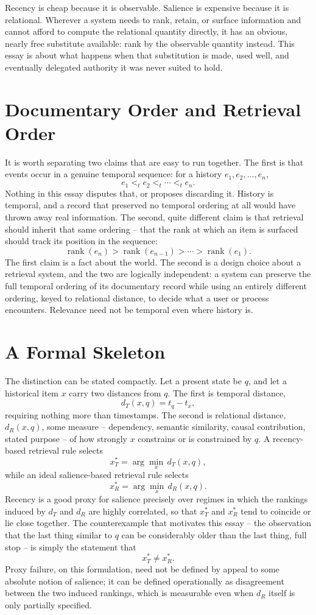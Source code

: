 \documentclass[11pt]{article}
\begin{document}
Recency is cheap because it is observable. Salience is expensive because it is relational. Wherever a system needs to rank, retain, or surface information and cannot afford to compute the relational quantity directly, it has an obvious, nearly free substitute available: rank by the observable quantity instead. This essay is about what happens when that substitution is made, used well, and eventually delegated authority it was never suited to hold.

\section{Documentary Order and Retrieval Order}

It is worth separating two claims that are easy to run together. The first is that events occur in a genuine temporal sequence: for a history $e_1, e_2, \ldots, e_n$,
\[
e_1 <_t e_2 <_t \cdots <_t e_n.
\]
Nothing in this essay disputes that, or proposes discarding it. History is temporal, and a record that preserved no temporal ordering at all would have thrown away real information. The second, quite different claim is that retrieval should inherit that same ordering -- that the rank at which an item is surfaced should track its position in the sequence:
\[
\operatorname{rank}(e_n) > \operatorname{rank}(e_{n-1}) > \cdots > \operatorname{rank}(e_1).
\]
The first claim is a fact about the world. The second is a design choice about a retrieval system, and the two are logically independent: a system can preserve the full temporal ordering of its documentary record while using an entirely different ordering, keyed to relational distance, to decide what a user or process encounters. Relevance need not be temporal even where history is.

\section{A Formal Skeleton}

The distinction can be stated compactly. Let a present state be $q$, and let a historical item $x$ carry two distances from $q$. The first is temporal distance,
\[
d_T(x,q) = t_q - t_x,
\]
requiring nothing more than timestamps. The second is relational distance, $d_R(x,q)$, some measure -- dependency, semantic similarity, causal contribution, stated purpose -- of how strongly $x$ constrains or is constrained by $q$. A recency-based retrieval rule selects
\[
x_T^* = \arg\min_x\, d_T(x,q),
\]
while an ideal salience-based retrieval rule selects
\[
x_R^* = \arg\min_x\, d_R(x,q).
\]
Recency is a good proxy for salience precisely over regimes in which the rankings induced by $d_T$ and $d_R$ are highly correlated, so that $x_T^*$ and $x_R^*$ tend to coincide or lie close together. The counterexample that motivates this essay -- the observation that the last thing similar to $q$ can be considerably older than the last thing, full stop -- is simply the statement that
\[
x_T^* \neq x_R^*.
\]
Proxy failure, on this formulation, need not be defined by appeal to some absolute notion of salience; it can be defined operationally as disagreement between the two induced rankings, which is measurable even when $d_R$ itself is only partially specified.
\end{document}
